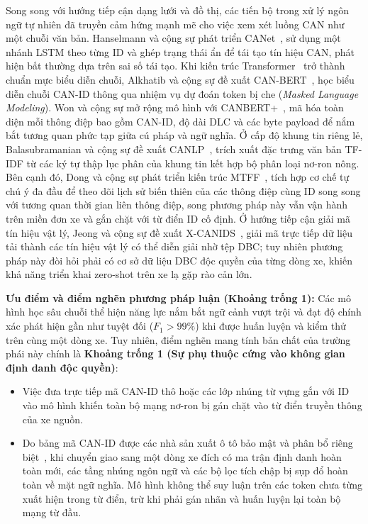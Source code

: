 \documentclass[12pt, a4paper, reqno, oneside]{book}
\begin{document}
Song song với hướng tiếp cận dạng lưới và đồ thị, các tiến bộ trong xử lý ngôn ngữ tự nhiên đã truyền cảm hứng mạnh mẽ cho việc xem xét luồng CAN như một chuỗi văn bản. Hanselmann và cộng sự phát triển CANet~\cite{hanselmann2020canet}, sử dụng một nhánh LSTM theo từng ID và ghép trạng thái ẩn để tái tạo tín hiệu CAN, phát hiện bất thường dựa trên sai số tái tạo. Khi kiến trúc Transformer~\cite{vaswani2017attention} trở thành chuẩn mực biểu diễn chuỗi, Alkhatib và cộng sự đề xuất CAN-BERT~\cite{alkhatib2022canbert}, học biểu diễn chuỗi CAN-ID thông qua nhiệm vụ dự đoán token bị che (\textit{Masked Language Modeling}). Won và cộng sự mở rộng mô hình với CANBERT+~\cite{won2026canbertplus}, mã hóa toàn diện mỗi thông điệp bao gồm CAN-ID, độ dài DLC và các byte payload để nắm bắt tương quan phức tạp giữa cú pháp và ngữ nghĩa. Ở cấp độ khung tin riêng lẻ, Balasubramanian và cộng sự đề xuất CANLP~\cite{balasubramanian2025canlp}, trích xuất đặc trưng văn bản TF-IDF từ các ký tự thập lục phân của khung tin kết hợp bộ phân loại nơ-ron nông. Bên cạnh đó, Dong và cộng sự phát triển kiến trúc MTFF~\cite{dong2026mtff}, tích hợp cơ chế tự chú ý đa đầu để theo dõi lịch sử biến thiên của các thông điệp cùng ID song song với tương quan thời gian liên thông điệp, song phương pháp này vẫn vận hành trên miền đơn xe và gắn chặt với từ điển ID cố định. Ở hướng tiếp cận giải mã tín hiệu vật lý, Jeong và cộng sự đề xuất X-CANIDS~\cite{jeong2024xcanids}, giải mã trực tiếp dữ liệu tải thành các tín hiệu vật lý có thể diễn giải nhờ tệp DBC; tuy nhiên phương pháp này đòi hỏi phải có cơ sở dữ liệu DBC độc quyền của từng dòng xe, khiến khả năng triển khai zero-shot trên xe lạ gặp rào cản lớn.

\textbf{Ưu điểm và điểm nghẽn phương pháp luận (Khoảng trống 1):}
Các mô hình học sâu chuỗi thể hiện năng lực nắm bắt ngữ cảnh vượt trội và đạt độ chính xác phát hiện gần như tuyệt đối ($F_1 > 99\%$) khi được huấn luyện và kiểm thử trên cùng một dòng xe. Tuy nhiên, điểm nghẽn mang tính bản chất của trường phái này chính là \textbf{Khoảng trống 1 (Sự phụ thuộc cứng vào không gian định danh độc quyền)}:
\begin{itemize}
    \item Việc đưa trực tiếp mã CAN-ID thô hoặc các lớp nhúng từ vựng gắn với ID vào mô hình khiến toàn bộ mạng nơ-ron bị gán chặt vào từ điển truyền thông của xe nguồn.
    \item Do bảng mã CAN-ID được các nhà sản xuất ô tô bảo mật và phân bổ riêng biệt~\cite{bosch1991can}, khi chuyển giao sang một dòng xe đích có ma trận định danh hoàn toàn mới, các tầng nhúng ngôn ngữ và các bộ lọc tích chập bị sụp đổ hoàn toàn về mặt ngữ nghĩa. Mô hình không thể suy luận trên các token chưa từng xuất hiện trong từ điển, trừ khi phải gán nhãn và huấn luyện lại toàn bộ mạng từ đầu.
\end{itemize}
\end{document}
